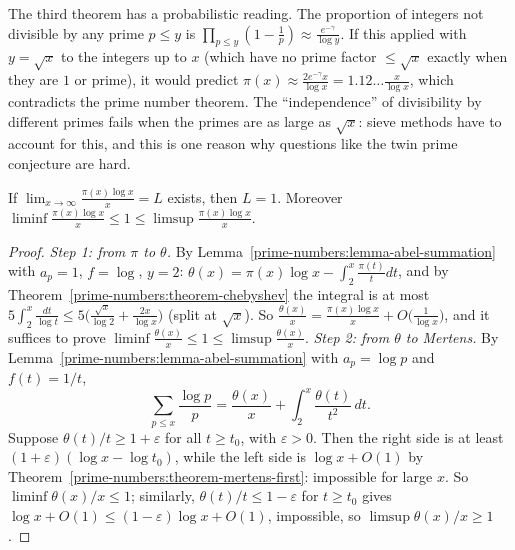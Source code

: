 \begin{remark}\label{prime-numbers:remark-mertens-meaning}
The third theorem has a probabilistic reading. The proportion of integers not divisible by any prime $p \leq y$ is $\prod_{p \leq y}(1 - \frac1p) \approx \frac{e^{-\gamma}}{\log y}$. If this applied with
$y = \sqrt{x}$ to the integers up to $x$ (which have no prime factor $\leq \sqrt{x}$ exactly when they are $1$ or prime), it would predict $\pi(x) \approx \frac{2e^{-\gamma}x}{\log x} = 1.12\ldots\frac{x}{\log x}$,
which contradicts the prime number theorem. The ``independence'' of divisibility by different primes fails when the primes are as large as $\sqrt{x}$: sieve methods have to account for this, and
this is one reason why questions like the twin prime conjecture are hard.
\end{remark}

\begin{theorem}[Chebyshev]\label{prime-numbers:theorem-chebyshev-limit}
If $\lim_{x \to \infty}\frac{\pi(x)\log x}{x} = L$ exists, then $L = 1$. Moreover $\liminf\frac{\pi(x)\log x}{x} \leq 1 \leq \limsup\frac{\pi(x)\log x}{x}$.
\end{theorem}

\begin{proof}
\emph{Step 1: from $\pi$ to $\theta$.} By Lemma~\ref{prime-numbers:lemma-abel-summation} with $a_p = 1$, $f = \log$, $y = 2$: $\theta(x) = \pi(x)\log x - \int_2^x\frac{\pi(t)}{t}dt$, and by
Theorem~\ref{prime-numbers:theorem-chebyshev} the integral is at most $5\int_2^x\frac{dt}{\log t} \leq 5\bigl(\frac{\sqrt{x}}{\log 2} + \frac{2x}{\log x}\bigr)$ (split at $\sqrt{x}$). So
$\frac{\theta(x)}{x} = \frac{\pi(x)\log x}{x} + O\bigl(\frac{1}{\log x}\bigr)$, and it suffices to prove $\liminf\frac{\theta(x)}{x} \leq 1 \leq \limsup\frac{\theta(x)}{x}$.
\emph{Step 2: from $\theta$ to Mertens.} By Lemma~\ref{prime-numbers:lemma-abel-summation} with $a_p = \log p$ and $f(t) = 1/t$,
\[
\sum_{p \leq x}\frac{\log p}{p} = \frac{\theta(x)}{x} + \int_2^x\frac{\theta(t)}{t^2}\,dt.
\]
Suppose $\theta(t)/t \geq 1 + \varepsilon$ for all $t \geq t_0$, with $\varepsilon > 0$. Then the right side is at least $(1 + \varepsilon)(\log x - \log t_0)$, while the left side is $\log x + O(1)$ by
Theorem~\ref{prime-numbers:theorem-mertens-first}: impossible for large $x$. So $\liminf\theta(x)/x \leq 1$; similarly, $\theta(t)/t \leq 1 - \varepsilon$ for $t \geq t_0$ gives
$\log x + O(1) \leq (1 - \varepsilon)\log x + O(1)$, impossible, so $\limsup\theta(x)/x \geq 1$.
\end{proof}

